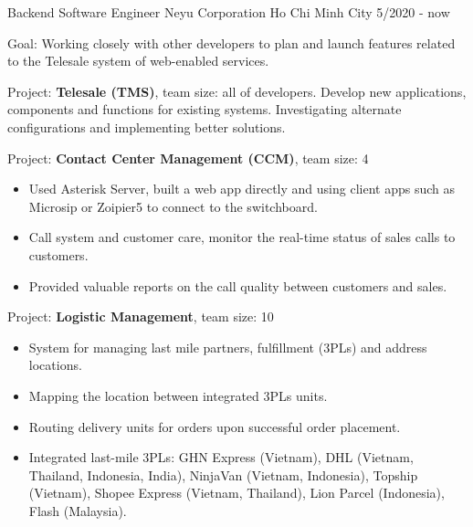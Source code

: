   \cventry
    {Backend Software Engineer} %
    {Neyu Corporation} %
    {Ho Chi Minh City} %
    {5/2020 - now} %
    {
      \begin{cvitems} %
        \item {Goal: Working closely with other developers to plan and launch features related to the Telesale system of web-enabled services.}
        \item { Project: \textbf{Telesale (TMS)}, team size: all of developers. Develop new applications, components and functions for existing systems. Investigating alternate configurations and implementing better solutions. }
        \item { Project: \textbf{Contact Center Management (CCM)}, team size: 4 }
        {
            \begin{itemize}
                \item {Used Asterisk Server, built a web app directly and using client apps such as Microsip or Zoipier5 to connect to the switchboard.}
                \item { Call system and customer care, monitor the real-time status of sales calls to customers. }
                \item { Provided valuable reports on the call quality between customers and sales. }
            \end{itemize}
        }
        \item { Project: \textbf{Logistic Management}, team size: 10 }
        {
            \begin{itemize}
                \item { System for managing last mile partners, fulfillment (3PLs) and address locations. }
                \item { Mapping the location between integrated 3PLs units. }
                \item { Routing delivery units for orders upon successful order placement. }
                \item { Integrated last-mile 3PLs: GHN Express (Vietnam), DHL (Vietnam, Thailand, Indonesia, India), NinjaVan (Vietnam, Indonesia), Topship (Vietnam), Shopee Express (Vietnam, Thailand), Lion Parcel (Indonesia), Flash (Malaysia). }

\end{itemize}}
\end{cvitems}}
